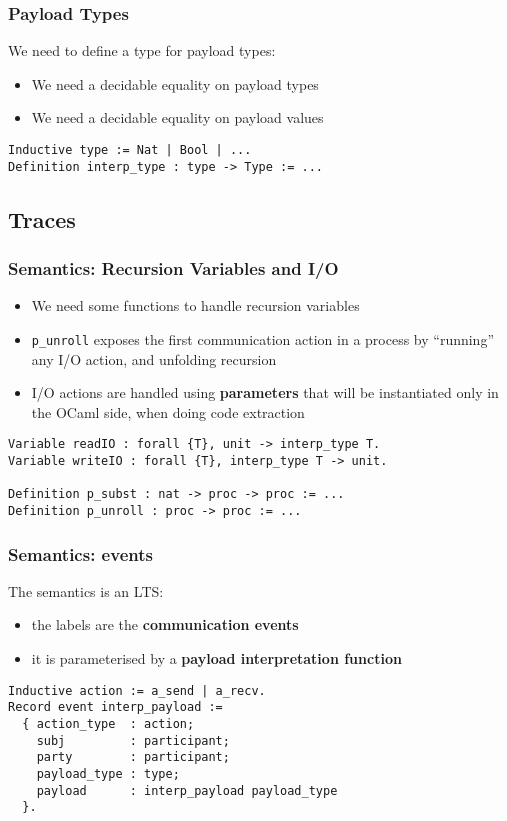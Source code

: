\begin{frame}[fragile]
    \frametitle{Payload Types}
    We need to define a type for payload types:
    \begin{itemize}
    \item We need a decidable equality on payload types
    \item We need a decidable equality on payload values
    \end{itemize}
\vspace{1cm}
    \begin{verbatim}
Inductive type := Nat | Bool | ...
Definition interp_type : type -> Type := ...
    \end{verbatim}
\end{frame}

\subsection{Traces}

\begin{frame}[fragile]
    \frametitle{Semantics: Recursion Variables and I/O}
\begin{itemize}
    \item We need some functions to handle recursion variables
    \item \texttt{p\_unroll} exposes the first communication action in a process by
    ``running'' any I/O action, and unfolding recursion
    \item I/O actions are handled using \textbf{parameters} that will be instantiated
only in the OCaml side, when doing code extraction
\end{itemize}
\vspace{1cm}
    \begin{verbatim}
Variable readIO : forall {T}, unit -> interp_type T.
Variable writeIO : forall {T}, interp_type T -> unit.

Definition p_subst : nat -> proc -> proc := ...
Definition p_unroll : proc -> proc := ...
    \end{verbatim}
\end{frame}

\begin{frame}[fragile]
    \frametitle{Semantics: events}
    The semantics is an LTS: 
    \begin{itemize}
    \item the labels are the \textbf{communication events}
    \item it is parameterised by a \textbf{payload interpretation function}
    \end{itemize}
\vspace{.5cm}
    \begin{verbatim}
Inductive action := a_send | a_recv.
Record event interp_payload :=
  { action_type  : action;
    subj         : participant;
    party        : participant;
    payload_type : type;
    payload      : interp_payload payload_type
  }.
    \end{verbatim}
\end{frame}

